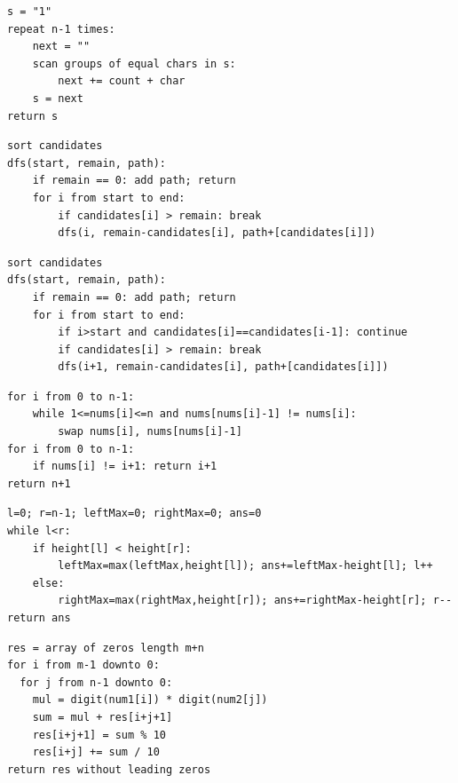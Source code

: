 \documentclass[11pt,a4paper]{ctexart}
\begin{document}
\begin{verbatim}
s = "1"
repeat n-1 times:
    next = ""
    scan groups of equal chars in s:
        next += count + char
    s = next
return s
\end{verbatim}

\begin{verbatim}
sort candidates
dfs(start, remain, path):
    if remain == 0: add path; return
    for i from start to end:
        if candidates[i] > remain: break
        dfs(i, remain-candidates[i], path+[candidates[i]])
\end{verbatim}

\begin{verbatim}
sort candidates
dfs(start, remain, path):
    if remain == 0: add path; return
    for i from start to end:
        if i>start and candidates[i]==candidates[i-1]: continue
        if candidates[i] > remain: break
        dfs(i+1, remain-candidates[i], path+[candidates[i]])
\end{verbatim}

\begin{verbatim}
for i from 0 to n-1:
    while 1<=nums[i]<=n and nums[nums[i]-1] != nums[i]:
        swap nums[i], nums[nums[i]-1]
for i from 0 to n-1:
    if nums[i] != i+1: return i+1
return n+1
\end{verbatim}

\begin{verbatim}
l=0; r=n-1; leftMax=0; rightMax=0; ans=0
while l<r:
    if height[l] < height[r]:
        leftMax=max(leftMax,height[l]); ans+=leftMax-height[l]; l++
    else:
        rightMax=max(rightMax,height[r]); ans+=rightMax-height[r]; r--
return ans
\end{verbatim}

\begin{verbatim}
res = array of zeros length m+n
for i from m-1 downto 0:
  for j from n-1 downto 0:
    mul = digit(num1[i]) * digit(num2[j])
    sum = mul + res[i+j+1]
    res[i+j+1] = sum % 10
    res[i+j] += sum / 10
return res without leading zeros
\end{verbatim}
\end{document}
